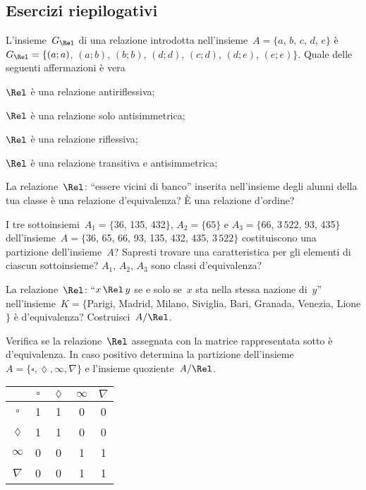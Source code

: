 \subsection{Esercizi riepilogativi}

\begin{esercizio}
\label{ese:7.51}
L'insieme~$G_\Rel$ di una relazione introdotta nell'insieme~$A = \{a$, $b$, $c$, $d$, $e\}$ è~$G_\Rel = \{ (a;a)$, $(a;b)$, $(b;b)$, $(d;d)$, $(c;d)$, $(d;e)$, $(e;e)\}$.
Quale delle seguenti affermazioni è vera
\begin{enumeratea}
\item $\Rel$ è una relazione antiriflessiva;
\item $\Rel$ è una relazione solo antisimmetrica;
\item $\Rel$ è una relazione riflessiva;
\item $\Rel$ è una relazione transitiva e antisimmetrica;
\end{enumeratea}
\end{esercizio}

\begin{esercizio}
\label{ese:7.52}
La relazione~$\Rel$: ``essere vicini di banco'' inserita nell'insieme degli alunni della tua classe è una
relazione d'equivalenza? \`E una relazione d'ordine?
\end{esercizio}

\begin{esercizio}
\label{ese:7.53}
I tre sottoinsiemi~$A_1 = \{$36, 135, 432$\}$, $A_2 = \{65\}$ e $A_3 = \{$66, $3\,522$, 93, 435$\}$ dell'insieme~$A = \{$36, 65, 66, 93, 135, 432, 435, $3\,522\}$ costituiscono una partizione dell'insieme~$A$? Sapresti trovare una caratteristica per gli elementi di ciascun sottoinsieme? $A_1$, $A_2$, $A_3$ sono classi d'equivalenza?
\end{esercizio}

\begin{esercizio}
\label{ese:7.54}
La relazione~$\Rel$: ``$x \,\Rel\, y$ se e solo se~$x$ sta nella stessa nazione di~$y$'' nell'insieme~$K= \{$Parigi, Madrid, Milano, Siviglia, Bari, Granada, Venezia, Lione$\}$
è d'equivalenza? Costruisci~$A/\Rel$.
\end{esercizio}

\begin{esercizio}
\label{ese:7.55}
Verifica se la relazione~$\Rel$ assegnata con la matrice rappresentata
sotto è d'equivalenza. In caso positivo determina la partizione dell'insieme~$A =\{\square, \lozenge, \infty, \nabla\}$ e l'insieme
quoziente~$A/\Rel$.

\begin{center}
\begin{tabular}{ccccc}
\toprule
 & $\square$ & $\lozenge$ & $\infty$ & $\nabla$\\
\midrule
 $\square$ & 1 & 1 & 0 & 0 \\
 $\lozenge$ & 1 & 1 & 0 & 0 \\
 $\infty$ & 0 & 0 & 1 & 1\\
 $\nabla$ & 0 & 0 & 1 & 1\\
\bottomrule
\end{tabular}
\end{center}
\end{esercizio}


